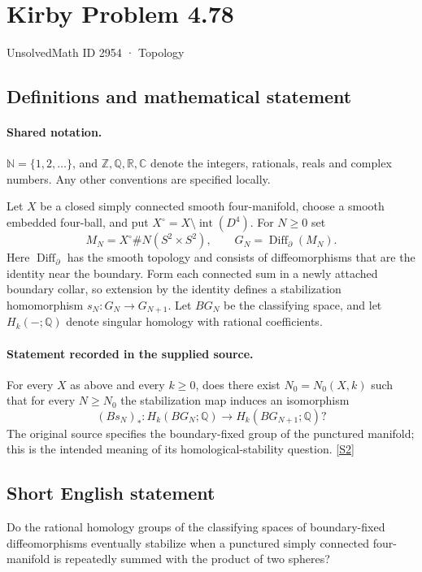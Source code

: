 \documentclass[11pt]{article}
\newcommand{\sref}[2]{\hyperlink{source:#1:#2}{[S#2]}}
\begin{document}
\setcounter{section}{2953}
\section{Kirby Problem 4.78}\label{2954}
{\small\sffamily UnsolvedMath ID 2954 · Topology}
\subsection{Definitions and mathematical statement}

\paragraph{Shared notation.}$\mathbb N=\{1,2,\ldots\}$, and $\mathbb Z,\mathbb Q,\mathbb R,\mathbb C$ denote the integers, rationals, reals and complex numbers. Any other conventions are specified locally.


Let $X$ be a closed simply connected smooth four-manifold, choose a smooth embedded four-ball, and put $X^{\circ}=X\setminus\operatorname{int}(D^4)$. For $N\ge0$ set
\[
M_N=X^{\circ}\#N(S^2\times S^2),\qquad G_N=\operatorname{Diff}_{\partial}(M_N).
\]
Here $\operatorname{Diff}_{\partial}$ has the smooth topology and consists of diffeomorphisms that are the identity near the boundary. Form each connected sum in a newly attached boundary collar, so extension by the identity defines a stabilization homomorphism $s_N:G_N\to G_{N+1}$. Let $BG_N$ be the classifying space, and let $H_k(-;\mathbb Q)$ denote singular homology with rational coefficients.
\paragraph{Statement recorded in the supplied source.}
For every $X$ as above and every $k\ge0$, does there exist $N_0=N_0(X,k)$ such that for every $N\ge N_0$ the stabilization map induces an isomorphism
\[
(Bs_N)_*:H_k(BG_N;\mathbb Q)\longrightarrow H_k(BG_{N+1};\mathbb Q)?
\]
The original source specifies the boundary-fixed group of the punctured manifold; this is the intended meaning of its homological-stability question. \sref{2954}{2}
\subsection{Short English statement}
Do the rational homology groups of the classifying spaces of boundary-fixed diffeomorphisms eventually stabilize when a punctured simply connected four-manifold is repeatedly summed with the product of two spheres?
\end{document}
